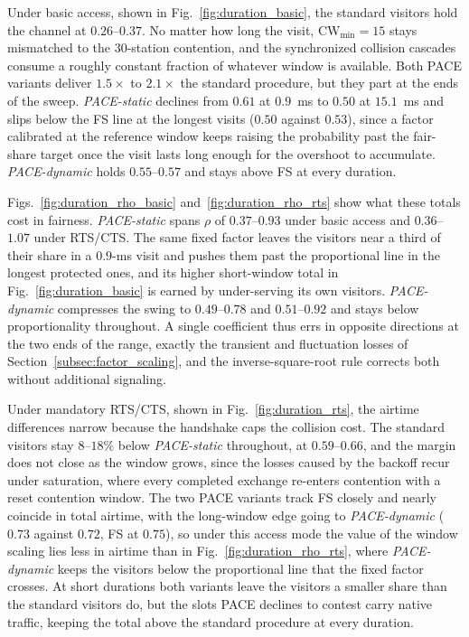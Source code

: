 \documentclass[journal,10pt]{IEEEtran}
\begin{document}
Under basic access, shown in Fig.~\ref{fig:duration_basic}, the standard
visitors hold the channel at $0.26$--$0.37$. No matter how long the visit,
$\mathrm{CW}_{\min}=15$ stays mismatched to the $30$-station contention,
and the synchronized collision cascades consume a roughly constant
fraction of whatever window is available. Both PACE variants deliver
$1.5\times$ to $2.1\times$ the standard procedure, but they part at the
ends of the sweep. \emph{PACE-static} declines from $0.61$ at $0.9$~ms to $0.50$ at
$15.1$~ms and slips below the FS line at the longest visits ($0.50$
against $0.53$), since a factor calibrated at the reference window keeps
raising the probability past the fair-share target once the visit lasts
long enough for the overshoot to accumulate. \emph{PACE-dynamic} holds
$0.55$--$0.57$ and stays above FS at every duration.

Figs.~\ref{fig:duration_rho_basic} and~\ref{fig:duration_rho_rts} show what these totals cost in fairness.
\emph{PACE-static} spans $\rho$ of $0.37$--$0.93$ under basic access and
$0.36$--$1.07$ under RTS/CTS. The same fixed factor leaves the visitors
near a third of their share in a $0.9$-ms visit and pushes them past
the proportional line in the longest protected ones, and its higher
short-window total in Fig.~\ref{fig:duration_basic} is earned by
under-serving its own visitors. \emph{PACE-dynamic} compresses the swing to
$0.49$--$0.78$ and $0.51$--$0.92$ and stays below proportionality
throughout. A single coefficient thus errs in opposite directions at
the two ends of the range, exactly the transient and fluctuation
losses of Section~\ref{subsec:factor_scaling}, and the
inverse-square-root rule corrects both without additional signaling.

Under mandatory RTS/CTS, shown in Fig.~\ref{fig:duration_rts}, the
airtime differences narrow because the handshake caps the collision
cost. The standard visitors stay $8$--$18\%$ below \emph{PACE-static}
throughout, at $0.59$--$0.66$, and the margin does not close as the
window grows, since the losses caused by the backoff recur under
saturation, where every completed exchange re-enters contention with a
reset contention window. The two PACE variants track FS closely and
nearly coincide in total airtime, with the long-window edge going to
\emph{PACE-dynamic} ($0.73$ against $0.72$, FS at $0.75$), so under this access
mode the value of the window scaling lies less in airtime than in
Fig.~\ref{fig:duration_rho_rts}, where \emph{PACE-dynamic} keeps the visitors
below the proportional line that the fixed factor crosses. At short durations both variants leave the visitors a smaller share than
the standard visitors do, but the slots PACE declines to contest carry
native traffic, keeping the total above the standard procedure at every
duration.
\end{document}
